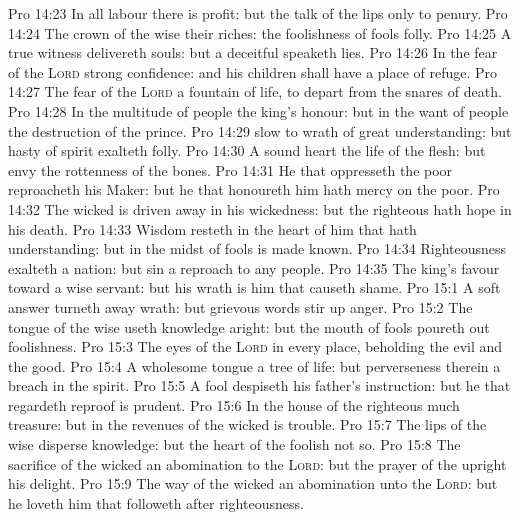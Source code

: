 \vs Pro 14:23 In all labour there is profit: but the talk of the lips  only to penury.
\vs Pro 14:24 The crown of the wise  their riches:  the foolishness of fools  folly.
\vs Pro 14:25 A true witness delivereth souls: but a deceitful  speaketh lies.
\vs Pro 14:26 In the fear of the \textsc{Lord}  strong confidence: and his children shall have a place of refuge.
\vs Pro 14:27 The fear of the \textsc{Lord}  a fountain of life, to depart from the snares of death.
\vs Pro 14:28 In the multitude of people  the king's honour: but in the want of people  the destruction of the prince.
\vs Pro 14:29  slow to wrath  of great understanding: but  hasty of spirit exalteth folly.
\vs Pro 14:30 A sound heart  the life of the flesh: but envy the rottenness of the bones.
\vs Pro 14:31 He that oppresseth the poor reproacheth his Maker: but he that honoureth him hath mercy on the poor.
\vs Pro 14:32 The wicked is driven away in his wickedness: but the righteous hath hope in his death.
\vs Pro 14:33 Wisdom resteth in the heart of him that hath understanding: but  in the midst of fools is made known.
\vs Pro 14:34 Righteousness exalteth a nation: but sin  a reproach to any people.
\vs Pro 14:35 The king's favour  toward a wise servant: but his wrath is  him that causeth shame.
\vs Pro 15:1 A soft answer turneth away wrath: but grievous words stir up anger.
\vs Pro 15:2 The tongue of the wise useth knowledge aright: but the mouth of fools poureth out foolishness.
\vs Pro 15:3 The eyes of the \textsc{Lord}  in every place, beholding the evil and the good.
\vs Pro 15:4 A wholesome tongue  a tree of life: but perverseness therein  a breach in the spirit.
\vs Pro 15:5 A fool despiseth his father's instruction: but he that regardeth reproof is prudent.
\vs Pro 15:6 In the house of the righteous  much treasure: but in the revenues of the wicked is trouble.
\vs Pro 15:7 The lips of the wise disperse knowledge: but the heart of the foolish  not so.
\vs Pro 15:8 The sacrifice of the wicked  an abomination to the \textsc{Lord}: but the prayer of the upright  his delight.
\vs Pro 15:9 The way of the wicked  an abomination unto the \textsc{Lord}: but he loveth him that followeth after righteousness.

